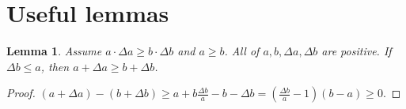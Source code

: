 \documentclass{article}
\theoremstyle{plain}
\newtheorem{lemma}{Lemma}
\theoremstyle{remark}
\newcommand{\crr}[1]{\noindent{\color{red}{#1}}}  %
\begin{document}


\section{Useful lemmas}
\begin{lemma}
Assume $a\cdot\Delta a\ge b\cdot\Delta b$ and $a\ge b$. All of $a,b,\Delta a, \Delta b$ are positive. If $\Delta b\le a$, then $a+\Delta a\ge b+\Delta b$.
\label{lem:ab1}
\end{lemma}
\begin{proof}
$(a+\Delta a)-(b+\Delta b)\ge a+b\frac{\Delta b}{a}-b-\Delta b=(\frac{\Delta b}{a}-1)(b-a)\ge 0$.
\end{proof}
\end{document}
